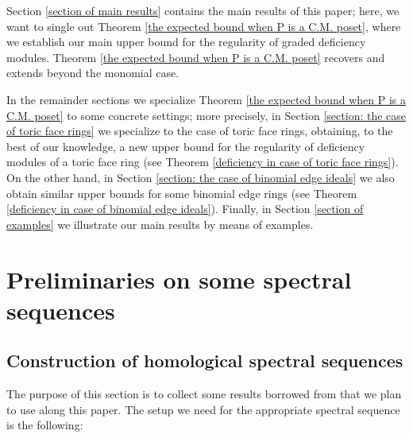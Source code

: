 \documentclass[11pt]{amsart}
\begin{document}
Section \ref{section of main results} contains the main results of this paper; here, we want to single out Theorem \ref{the expected bound when P is a C.M. poset}, where we establish our main upper bound for the regularity of graded deficiency modules. Theorem \ref{the expected bound when P is a C.M. poset} recovers and extends \cite{KumminiMurai2011} beyond the monomial case.

In the remainder sections we specialize Theorem \ref{the expected bound when P is a C.M. poset} to some concrete settings; more precisely, in Section \ref{section: the case of toric face rings} we specialize to the case of toric face rings, obtaining, to the best of our knowledge, a new upper bound for the regularity of deficiency modules of a toric face ring (see Theorem \ref{deficiency in case of toric face rings}). On the other hand, in Section \ref{section: the case of binomial edge ideals} we also obtain similar upper bounds for some binomial edge rings (see Theorem \ref{deficiency in case of binomial edge ideals}). Finally, in Section \ref{section of examples} we illustrate our main results by means of examples.


\section{Preliminaries on some spectral sequences}\label{section on preliminaries on spectral sequences}

\subsection{Construction of homological spectral sequences}
The purpose of this section is to collect some results borrowed from \cite{AlvarezBoixZarzuelaspectralsequences} that we plan to use along this paper.
The setup we need for the appropriate  spectral sequence is the following:
\end{document}
